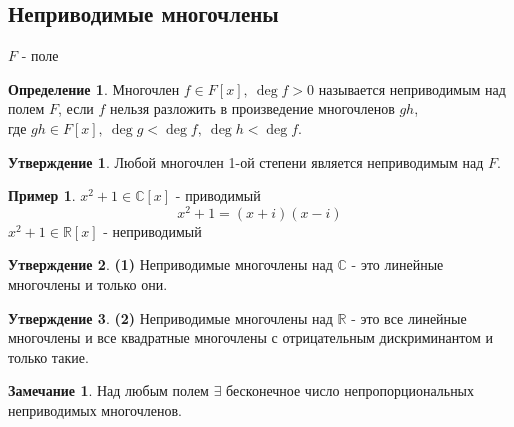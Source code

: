 \documentclass[a4paper, 12pt]{article}
\newcommand{\R}{\mathbb R}
\newcommand\tab[1][.5cm]{\hspace*{#1}}
\theoremstyle{definition}
\newtheorem*{definition}{Определение}
\newtheorem*{subtheorem}{Утверждение}
\newtheorem*{remark}{Замечание}
\newtheorem*{example1}{Пример}
\begin{document}
  \subsection{Неприводимые многочлены}
  $F$ - поле
  \begin{definition}
    Многочлен $f \in F[x], \ \deg f > 0$ называется неприводимым над полем $F$, если $f$ нельзя разложить в произведение многочленов $gh$, \\где $gh \in F[x], \ \deg g < \deg f, \ \deg h < \deg f$.
  \end{definition}
  \begin{subtheorem}
    Любой многочлен 1-ой степени является неприводимым над $F$. 
  \end{subtheorem}
  \begin{example1} 
    $x^2 + 1 \in \mathbb{C}[x]$ - приводимый
    $$x^2 + 1 = (x+i)(x-i)$$
    \tab[11cm]$x^2 + 1 \in \R[x]$ - неприводимый  
  \end{example1} 
  \begin{subtheorem}\textbf{(1)}
    Неприводимые многочлены над $\mathbb{C}$ - это линейные многочлены и только они. 
  \end{subtheorem}
  \begin{subtheorem}\textbf{(2)}
    Неприводимые многочлены над $\R$ - это все линейные многочлены и все квадратные многочлены с отрицательным дискриминантом и только такие.  
  \end{subtheorem}
  \begin{remark}
    Над любым полем $\exists$ бесконечное число непропорциональных\\ неприводимых многочленов.
  \end{remark}   
\end{document}

